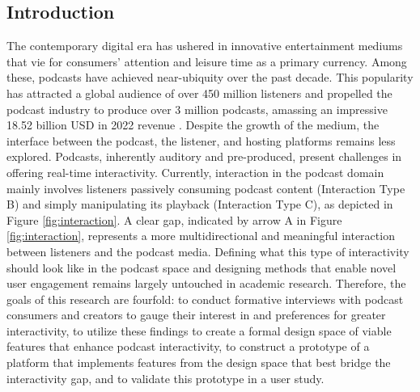 \documentclass[12pt]{report}
\begin{document}
\begin{myfont}
        \tableofcontents
        \clearpage
        
        \clearpage
        
        \listoffigures
        \clearpage
        
        \listoftables
        \clearpage
        

        \onehalfspacing
        
        \chapter{Introduction}
        The contemporary digital era has ushered in innovative entertainment mediums that vie for consumers' attention and leisure time as a primary currency. Among these, podcasts have achieved near-ubiquity over the past decade. This popularity has attracted a global audience of over 450 million listeners and propelled the podcast industry to produce over 3 million podcasts, amassing an impressive 18.52 billion USD in 2022 revenue \citep{CramerFlood2020}\citep{ListenNotes2023}\citep{GrandViewResearch2023}. Despite the growth of the medium, the interface between the podcast, the listener, and hosting platforms remains less explored. Podcasts, inherently auditory and pre-produced, present challenges in offering real-time interactivity. Currently, interaction in the podcast domain mainly involves listeners passively consuming podcast content (Interaction Type B) and simply manipulating its playback (Interaction Type C), as depicted in Figure \ref{fig:interaction}. A clear gap, indicated by arrow A in Figure \ref{fig:interaction}, represents a more multidirectional and meaningful interaction between listeners and the podcast media. Defining what this type of interactivity should look like in the podcast space and designing methods that enable novel user engagement remains largely untouched in academic research. Therefore, the goals of this research are fourfold: to conduct formative interviews with podcast consumers and creators to gauge their interest in and preferences for greater interactivity, to utilize these findings to create a formal design space of viable features that enhance podcast interactivity, to construct a prototype of a platform that implements features from the design space that best bridge the interactivity gap, and to validate this prototype in a user study.\\

\end{myfont}
\end{document}
